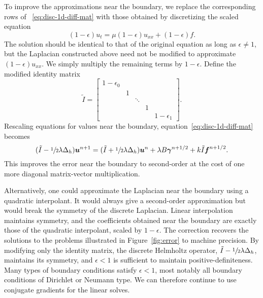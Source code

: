 To improve the approximations near the boundary, we replace the corresponding rows of~%
\eqref{eq:disc-1d-diff-mat} with those obtained by discretizing the scaled equation
\begin{equation}\label{eq:scaled}
    (1-\epsilon)u_t = \mu(1-\epsilon)u_{xx} + (1-\epsilon)f.
\end{equation}
The solution should be identical to that of the original equation as long as
$\epsilon\neq 1$, but the Laplacian constructed above need not be modified to approximate
$(1-\epsilon) u_{xx}$. We simply multiply the remaining terms by $1-\epsilon$. Define the
modified identity matrix
\begin{equation}\label{eq:mod-ident}
    \tilde{I} = \left[\begin{array}{ccccc}
            1-\epsilon_0 &   &        &   &         \\
                         & 1 &        &   &         \\
                         &   & \ddots &   &         \\
                         &   &        & 1 &         \\
                         &   &        &   & 1-\epsilon_1
            \end{array}\right].
\end{equation}
Rescaling equations for values near the boundary, equation~\eqref{eq:disc-1d-diff-mat}
becomes
\begin{equation}\label{eq:1d-diff-mat}
    (\tilde{I}-\sfrac12\lambda \Delta_h)\boldsymbol{u}^{n+1} = (\tilde{I}+\sfrac12\lambda \Delta_h)\boldsymbol{u}^n + \lambda B\boldsymbol{\gamma}^{n+1/2} + k\tilde{I}\boldsymbol{f}^{n+1/2}.
\end{equation}
This improves the error near the boundary to second-order at the cost of one more
diagonal matrix-vector multiplication.

Alternatively, one could approximate the Laplacian near the boundary using a quadratic
interpolant. It would always give a second-order approximation but would break the
symmetry of the discrete Laplacian. Linear interpolation maintains symmetry, and the
coefficients obtained near the boundary are exactly those of the quadratic interpolant,
scaled by $1-\epsilon$. The correction recovers the solutions to the problems illustrated
in Figure~\ref{fig:error} to machine precision. By modifying only the identity matrix,
the discrete Helmholtz operator, $\tilde{I}-\sfrac12\lambda \Delta_h$, maintains its
symmetry, and $\epsilon < 1$ is sufficient to maintain positive-definiteness. Many types
of boundary conditions satisfy $\epsilon < 1$, most notably all boundary conditions of
Dirichlet or Neumann type. We can therefore continue to use conjugate gradients for the
linear solves.

